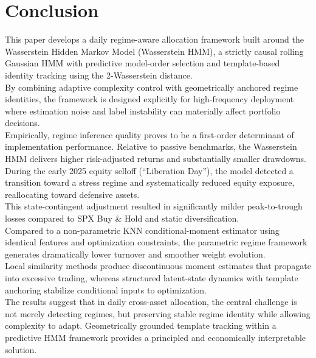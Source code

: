 \documentclass[11pt]{article}
\begin{document}
\section{Conclusion}

This paper develops a daily regime-aware allocation framework built around the Wasserstein Hidden Markov Model (Wasserstein HMM), a strictly causal rolling Gaussian HMM with predictive model-order selection and template-based identity tracking using the 2-Wasserstein distance.\\ 
By combining adaptive complexity control with geometrically anchored regime identities, the framework is designed explicitly for high-frequency deployment where estimation noise and label instability can materially affect portfolio decisions.\\
Empirically, regime inference quality proves to be a first-order determinant of implementation performance. 
Relative to passive benchmarks, the Wasserstein HMM delivers higher risk-adjusted returns and substantially smaller drawdowns. 
During the early 2025 equity selloff (“Liberation Day”), the model detected a transition toward a stress regime and systematically reduced equity exposure, reallocating toward defensive assets. \\
This state-contingent adjustment resulted in significantly milder peak-to-trough losses compared to SPX Buy \& Hold and static diversification.\\
Compared to a non-parametric KNN conditional-moment estimator using identical features and optimization constraints, the parametric regime framework generates dramatically lower turnover and smoother weight evolution. \\
Local similarity methods produce discontinuous moment estimates that propagate into excessive trading, whereas structured latent-state dynamics with template anchoring stabilize conditional inputs to optimization.\\
The results suggest that in daily cross-asset allocation, the central challenge is not merely detecting regimes, but preserving stable regime identity while allowing complexity to adapt. 
Geometrically grounded template tracking within a predictive HMM framework provides a principled and economically interpretable solution.
\end{document}
